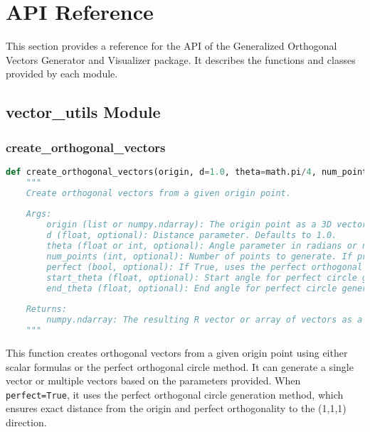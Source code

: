 
\newpage
\section{API Reference}

This section provides a reference for the API of the Generalized Orthogonal Vectors Generator and Visualizer package. It describes the functions and classes provided by each module.

\subsection{vector\_utils Module}

\subsubsection{create\_orthogonal\_vectors}

\begin{lstlisting}[language=Python]
def create_orthogonal_vectors(origin, d=1.0, theta=math.pi/4, num_points=None, perfect=False, start_theta=None, end_theta=None):
    """
    Create orthogonal vectors from a given origin point.
    
    Args:
        origin (list or numpy.ndarray): The origin point as a 3D vector [x, y, z]
        d (float, optional): Distance parameter. Defaults to 1.0.
        theta (float or int, optional): Angle parameter in radians or number of points if num_points is provided. Defaults to pi/4.
        num_points (int, optional): Number of points to generate. If provided, generates multiple vectors.
        perfect (bool, optional): If True, uses the perfect orthogonal circle generation method. Defaults to False.
        start_theta (float, optional): Start angle for perfect circle generation. Defaults to 0.
        end_theta (float, optional): End angle for perfect circle generation. Defaults to 2*pi.
        
    Returns:
        numpy.ndarray: The resulting R vector or array of vectors as a numpy array
    """
\end{lstlisting}

This function creates orthogonal vectors from a given origin point using either scalar formulas or the perfect orthogonal circle method. It can generate a single vector or multiple vectors based on the parameters provided. When \texttt{perfect=True}, it uses the perfect orthogonal circle generation method, which ensures exact distance from the origin and perfect orthogonality to the (1,1,1) direction.

